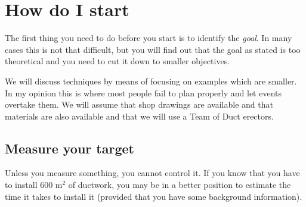 \section*{How do I start}

The first thing you need to do before you start is to identify the \textit{goal}.
In many cases this is not that difficult, but you will find out that the goal as
stated is too theoretical and you need to cut it down to smaller objectives.

We will discuss techniques by means of focusing on examples which are smaller.
In my opinion this is where most people fail to plan properly and let events
overtake them. We will assume that shop drawings are available and that materials
are also available and that we will use a Team of Duct erectors.

\subsection*{Measure your target}

Unless you measure something, you cannot control it. If you know that you have to install 600 m$^2$ of ductwork, you may be in a better position to estimate the time
it takes to install it (provided that you have some background information). 



